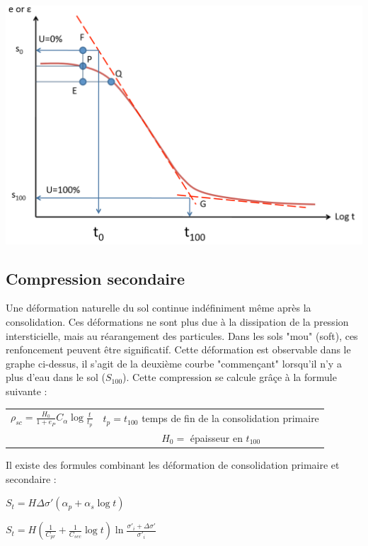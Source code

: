     \begin{center}
    \includegraphics[scale=0.5]{Verastegui/images/V6.PNG} 
    \end{center}
    
\subsection{Compression secondaire}
    
    Une déformation naturelle du sol continue indéfiniment même après la consolidation. Ces déformations ne sont plus due à la dissipation de la pression intersticielle, mais au réarangement des particules. Dans les sols "mou" (soft), ces renfoncement peuvent être significatif. Cette déformation est observable dans le graphe ci-dessus, il s'agit de la deuxième courbe "commençant" lorsqu'il n'y a plus d'eau dans le sol ($S_100$). Cette compression se calcule grâçe à la formule suivante : \\
    
    \begin{center}
    \begin{tabular}{c|c}
    $ \rho_{sc} = \frac{H_0}{1+e_P} C_\alpha \log \frac{t}{t_p} $  &   $t_p = t_{100}$ temps de fin de la consolidation primaire  \\
        &  $H_0 = $ épaisseur en $t_{100}$ 
    \end{tabular}
    \end{center}
    
    Il existe des formules combinant les déformation de consolidation primaire et secondaire : 

    \begin{center}
    $S_t = H\Delta\sigma'(\alpha_p + \alpha_s \log t)$
    
    \smallskip
    $S_t = H(\frac{1}{C_{pr}} + \frac{1}{C_{sec}} \log t) \ln \frac{\sigma'_i + \Delta \sigma'}{\sigma'_i}$
    \end{center} 
    
